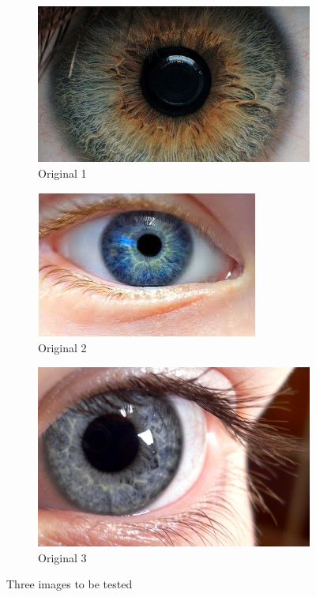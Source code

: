 \documentclass{article}
\begin{document}
%
%
\begin{figure}[H]
\centering

\begin{subfigure}{.3\textwidth}
  \centering
  \includegraphics[width=1.0\linewidth]{res/pupil/results/index.jpg}
  \caption{Original 1}
  \label{fig:}
\end{subfigure}%
\begin{subfigure}{.3\textwidth}
  \centering
  \includegraphics[width=0.9\linewidth]{res/pupil/results/eye3.jpg}
  \caption{Original 2}
  \label{fig:}
\end{subfigure}
\begin{subfigure}{.3\textwidth}
  \centering
  \includegraphics[width=0.9\linewidth]{res/pupil/results/eye4.jpg}
  \caption{Original 3}
  \label{fig:}
\end{subfigure}

\caption{Three images to be tested}
\label{fig:result_orgs}
\end{figure}
\end{document}
